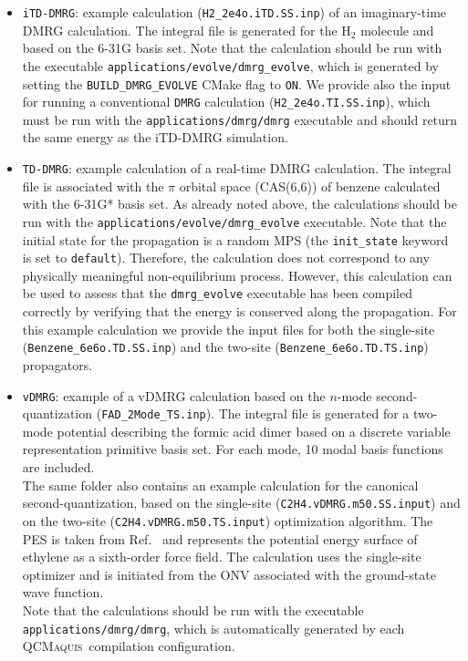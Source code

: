 \documentclass[bibliography=totoc,12pt,a4paper]{scrartcl}
\newcommand{\qcm}{\textsc{QCMaquis}}
\begin{document}
\begin{itemize}
 \item \texttt{iTD-DMRG}: example calculation (\texttt{H2\_2e4o.iTD.SS.inp}) of an imaginary-time DMRG calculation.
 The integral file is generated for the H$_2$ molecule and based on the 6-31G basis set.
 Note that the calculation should be run with the executable \texttt{applications/evolve/dmrg\_evolve}, which is generated by setting the \texttt{BUILD\_DMRG\_EVOLVE} CMake flag to \texttt{ON}.
 We provide also the input for running a conventional \texttt{DMRG} calculation (\texttt{H2\_2e4o.TI.SS.inp}), which must be run with the \texttt{applications/dmrg/dmrg} executable and should return the same energy as the iTD-DMRG simulation.
 \item \texttt{TD-DMRG}: example calculation of a real-time DMRG calculation. The integral file is associated with the $\pi$ orbital space (CAS(6,6)) of benzene calculated with the 6-31G* basis set. As already noted above, the calculations should be run with the \texttt{applications/evolve/dmrg\_evolve} executable.
 Note that the initial state for the propagation is a random MPS (the \texttt{init\_state} keyword is set to \texttt{default}).
 Therefore, the calculation does not correspond to any physically meaningful non-equilibrium process. 
 However, this calculation can be used to assess that the \texttt{dmrg\_evolve} executable has been compiled correctly by verifying that the energy is conserved along the propagation.
 For this example calculation we provide the input files for both the single-site (\texttt{Benzene\_6e6o.TD.SS.inp}) and the two-site (\texttt{Benzene\_6e6o.TD.TS.inp}) propagators.
 \item \texttt{vDMRG}: example of a vDMRG calculation based on the $n$-mode second-quantization (\texttt{FAD\_2Mode\_TS.inp}).
 The integral file is generated for a two-mode potential describing the formic acid dimer based on a discrete variable representation primitive basis set.
 For each mode, 10 modal basis functions are included. \\
 The same folder also contains an example calculation for the canonical second-quantization, based on the single-site (\texttt{C2H4.vDMRG.m50.SS.input}) and on the two-site (\texttt{C2H4.vDMRG.m50.TS.input}) optimization algorithm.
 The PES is taken from Ref.~ and represents the potential energy surface of ethylene as a sixth-order force field.
 The calculation uses the single-site optimizer and is initiated from the ONV associated with the ground-state wave function. \\
 Note that the calculations should be run with the executable \texttt{applications/dmrg/dmrg}, which is automatically generated by each \qcm\ compilation configuration. \\
\end{itemize}
\end{document}
